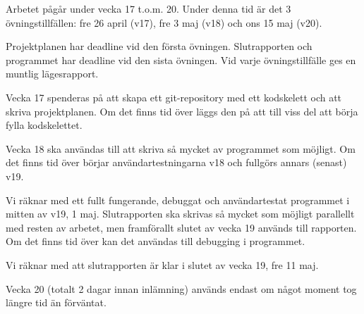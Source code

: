 Arbetet pågår under vecka 17 t.o.m. 20.
Under denna tid är det 3 övningstillfällen:
fre 26 april (v17),
fre 3 maj (v18) och
ons 15 maj (v20).

Projektplanen har deadline vid den första övningen.
Slutrapporten och programmet har deadline vid den sista övningen.
Vid varje övningstillfälle ges en muntlig lägesrapport.

Vecka 17 spenderas på att skapa ett git-repository med ett kodskelett och
att skriva projektplanen.
Om det finns tid över läggs den på att till viss del att börja
fylla kodskelettet.

Vecka 18 ska användas till att skriva så mycket av programmet som möjligt.
Om det finns tid över börjar användartestningarna v18 och fullgörs annars
(senast) v19.

Vi räknar med ett fullt fungerande, debuggat och användartestat
programmet i mitten av v19, 1 maj.
Slutrapporten ska skrivas så mycket som möjligt parallellt
med resten av arbetet,
men framförallt slutet av vecka 19 används till rapporten.
Om det finns tid över kan det användas till debugging i programmet.

Vi räknar med att slutrapporten är klar i slutet av vecka 19, fre 11 maj.

Vecka 20 (totalt 2 dagar innan inlämning) används endast om något
moment tog längre tid än förväntat.
